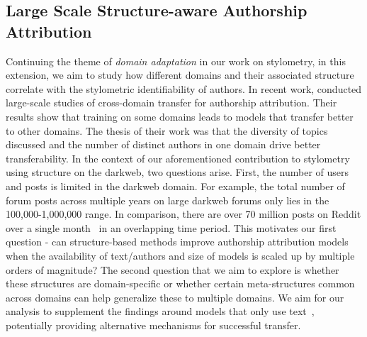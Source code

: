 \subsection{Large Scale Structure-aware Authorship Attribution}
Continuing the theme of \textit{domain adaptation} in our work on stylometry, in this extension, we aim to study how different domains and their associated structure correlate with the stylometric identifiability of authors.
In recent work, \citet{barlas2020cross,riverastao2021learning} conducted large-scale studies of cross-domain transfer for authorship attribution. 
Their results show that training on some domains leads to models that transfer better to other domains.
The thesis of their work was that the diversity of topics discussed and the number of distinct authors in one domain drive better transferability.
In the context of our aforementioned contribution to stylometry using structure on the darkweb, two questions arise.
First, the number of users and posts is limited in the darkweb domain. 
For example, the total number of forum posts across multiple years on large darkweb forums only lies in the 100,000-1,000,000 range.
In comparison, there are over 70 million posts on Reddit over a single month~\citep{andrews2019learning} in an overlapping time period.
This motivates our first question - can structure-based methods improve authorship attribution models when the availability of text/authors and size of models is scaled up by multiple orders of magnitude?
The second question that we aim to explore is whether these structures are domain-specific or whether certain meta-structures common across domains can help generalize these to multiple domains.
We aim for our analysis to supplement the findings around models that only use text~\cite{barlas2020cross,riverastao2021learning}, potentially providing alternative mechanisms for successful transfer.



